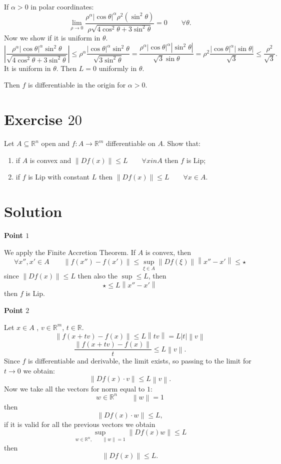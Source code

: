 \documentclass[a4paper, twoside, openany]{book}
\newcommand{\norm}[1]{\left\lVert#1\right\rVert}
\begin{document}
If $\alpha > 0$ in polar coordinates:
$$\lim_{\rho \rightarrow 0} \frac{\rho^{\alpha} |\cos \theta|^{\alpha} \rho^2 (\sin^2 \theta)}{\rho  \sqrt{4 \cos^2 \theta + 3 \sin^2 \theta}} = 0 \qquad \forall \theta.$$
Now we show if it is uniform in $\theta$.
$$|\frac{\rho^{\alpha} |\cos \theta|^{\alpha} \sin^2 \theta}{\sqrt{4 \cos^2 \theta + 3 \sin^2 \theta}}| \leq \rho^{\alpha} \frac{|\cos \theta|^{\alpha} \sin^2 \theta}{\sqrt{3 \sin^2 \theta}} = \frac{\rho^{\alpha} |\cos \theta|^{\alpha} |\sin^2 \theta|}{\sqrt{3} \sin \theta} = \rho^2 \frac{|\cos \theta|^{\alpha} |\sin \theta|}{\sqrt{3}} \leq \frac{\rho^2}{\sqrt{3}}.$$
It is uniform in $\theta$. Then $L = 0$ uniformly in $\theta$. \par  
Then $f$ is differentiable in the origin for $\alpha > 0$.
\clearpage
\section*{Exercise $20$}
Let $A \subseteq \mathbb{R}^n$ open and $f: A \rightarrow \mathbb{R}^m$ differentiable on $A$. Show that:
\begin{enumerate}
\item if $A$ is convex and $\norm{Df(x)} \leq L \qquad \forall x 	in A$ then $f$ is Lip;
\item if $f$ is Lip with constant $L$ then $\norm{Df(x)} \leq L \qquad \forall x \in A$.
\end{enumerate}
\section*{Solution}
\textbf{Point $1$} \par 
We apply the Finite Accretion Theorem. If $A$ is convex, then
$$\forall x'', x' \in A \qquad \norm{f(x'') - f(x')} \leq \sup_{\xi \in A} \norm{Df(\xi)} \norm{x'' - x'} \leq \star$$
since $\norm{Df(x)} \leq L$ then also the $\sup \leq L$, then
$$\star \leq L \norm{x'' - x'}$$
then $f$ is Lip. \par   
\textbf{Point $2$} \par   
Let $x \in A$ , $v \in \mathbb{R}^m$, $t \in \mathbb{R}$.
$$\norm{f(x + tv) - f(x)} \leq L \norm{t v} = L |t| \norm{v}$$
$$\frac{\norm{f(x + tv) - f(x)}}{t} \leq L \norm{v}.$$
Since $f$ is differentiable and derivable, the limit exists, so passing to the limit for $t \rightarrow 0$ we obtain:
$$\norm{Df(x) \cdot v} \leq L \norm{v}.$$
Now we take all the vectors for norm equal to $1$:
$$w \in \mathbb{R}^n \qquad \norm{w} = 1$$
then
$$\norm{Df(x) \cdot w } \leq L,$$
if it is valid for all the previous vectors we obtain
$$\sup_{w \in \mathbb{R}^n, \qquad \norm{w} = 1} \norm{Df(x) w} \leq L$$
then
$$\norm{Df(x)} \leq L.$$
\clearpage
\end{document}
